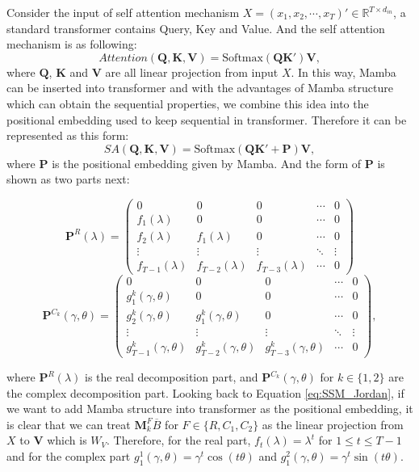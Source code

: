 Consider the input of self attention mechanism $X = (x_1,x_2,\cdots,x_T)' \in \mathbb{R}^{T \times d_{in}}$, a standard transformer contains Query, Key and Value. And the self attention mechanism is as following:
\begin{equation}
\label{eq:SA}
Attention(\boldsymbol{Q},\boldsymbol{K},\boldsymbol{V}) = \text{Softmax}(\boldsymbol{QK}')\boldsymbol{V},
\end{equation}
where $\boldsymbol{Q}$, $\boldsymbol{K}$ and $\boldsymbol{V}$ are all linear projection from input $X$. In this way, Mamba can be inserted into transformer and with the advantages of Mamba structure which can obtain the sequential properties, we combine this idea into the positional embedding used to keep sequential in transformer. Therefore it can be represented as this form:
\begin{equation}
SA(\boldsymbol{Q},\boldsymbol{K},\boldsymbol{V}) = \text{Softmax}(\boldsymbol{QK}'+\textbf{P})\boldsymbol{V},
\end{equation}
where $\textbf{P}$ is the positional embedding given by Mamba. And the form of $\textbf{P}$ is shown as two parts next:

$$
\mathbf{P}^R(\lambda)=\left(\begin{array}{ccccc}
0 & 0 & 0 & \cdots & 0 \\
f_1(\lambda) & 0 & 0 & \cdots & 0 \\
f_2(\lambda) & f_1(\lambda) & 0 & \cdots & 0 \\
\vdots & \vdots & \vdots & \ddots & \vdots \\
f_{T-1}(\lambda) & f_{T-2}(\lambda) & f_{T-3}(\lambda) & \cdots & 0
\end{array}\right)
$$
$$
\mathbf{P}^{C_k}(\gamma,\theta)=\left(\begin{array}{ccccc}
0 & 0 & 0 & \cdots & 0 \\
g^k_1(\gamma,\theta) & 0 & 0 & \cdots & 0 \\
g^k_2(\gamma,\theta) & g^k_1(\gamma,\theta) & 0 & \cdots & 0 \\
\vdots & \vdots & \vdots & \ddots & \vdots \\
g^k_{T-1}(\gamma,\theta) & g^k_{T-2}(\gamma,\theta) & g^k_{T-3}(\gamma,\theta) & \cdots & 0
\end{array}\right),
$$

where $\mathbf{P}^R(\lambda)$ is the real decomposition part, and $\mathbf{P}^{C_k}(\gamma,\theta)$ for $k\in\{1,2\}$ are the complex decomposition part. Looking back to Equation \ref{eq:SSM_Jordan}, if we want to add Mamba structure into transformer as the positional embedding, it is clear that we can treat $\boldsymbol{M}_k^F \overline{B}$ for $F \in \{R,C_1,C_2\}$ as the linear projection from $X$ to $\boldsymbol{V}$ which is $W_V$. Therefore, for the real part, $f_t(\lambda)=\lambda^t$ for $1 \leq t \leq T-1$ and for the complex part $g_1^1(\gamma,\theta)=\gamma^t \cos(t\theta)$ and $g_1^2(\gamma,\theta)=\gamma^t \sin(t\theta)$.

